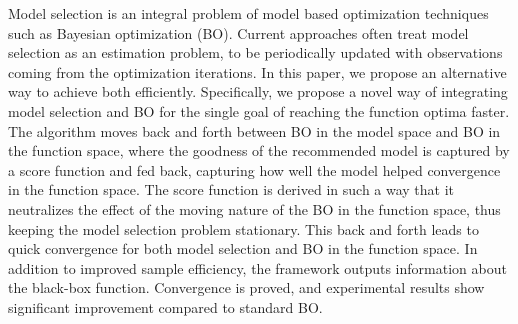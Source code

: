 Model selection is an integral problem of model based optimization techniques such as Bayesian optimization (BO). Current approaches often treat model selection as an estimation problem, to be periodically updated with observations coming from the optimization iterations. In this paper, we propose an alternative way to achieve both efficiently. Specifically, we propose a novel way of integrating model selection and BO for the single goal of reaching the function optima faster. The algorithm moves back and forth between BO in the model space and BO in the function space, where the goodness of the recommended model is captured by a score function and fed back, capturing how well the model helped convergence in the function space. The score function is derived in such a way that it neutralizes the effect of the moving nature of the BO in the function space, thus keeping the model selection problem stationary. This back and forth leads to quick convergence for both model selection and BO in the function space. In addition to improved sample efficiency, the framework outputs information about the black-box function. Convergence is proved, and experimental results show significant improvement compared to standard BO.